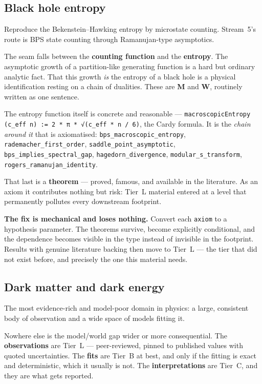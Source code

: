 \documentclass[11pt,a4paper]{article}
\begin{document}
\subsection{Black hole entropy}

Reproduce the Bekenstein–Hawking entropy by microstate counting. Stream~5's route is BPS state
counting through Ramanujan-type asymptotics.

The seam falls between the \textbf{counting function} and the \textbf{entropy}. The asymptotic
growth of a partition-like generating function is a hard but ordinary analytic fact. That this
growth \emph{is} the entropy of a black hole is a physical identification resting on a chain of
dualities. These are \textbf{M} and \textbf{W}, routinely written as one sentence.

The entropy function itself is concrete and reasonable —
\texttt{macroscopicEntropy (c_eff n) := 2 * π * √(c_eff * n / 6)}, the Cardy formula. It is
the \emph{chain around it} that is axiomatised: \texttt{bps_macroscopic_entropy},
\texttt{rademacher_first_order}, \texttt{saddle_point_asymptotic},
\texttt{bps_implies_spectral_gap}, \texttt{hagedorn_divergence}, \texttt{modular_s_transform},
\texttt{rogers_ramanujan_identity}.

That last is a \textbf{theorem} — proved, famous, and available in the literature. As an axiom it
contributes nothing but risk: Tier~L material entered at a level that permanently pollutes every
downstream footprint.

\textbf{The fix is mechanical and loses nothing.} Convert each \texttt{axiom} to a hypothesis
parameter. The theorems survive, become explicitly conditional, and the dependence becomes
visible in the type instead of invisible in the footprint. Results with genuine literature
backing then move to Tier~\textsf{L} — the tier that did not exist before, and precisely the one
this material needs.

\subsection{Dark matter and dark energy}

The most evidence-rich and model-poor domain in physics: a large, consistent body of observation
and a wide space of models fitting it.

Nowhere else is the model/world gap wider or more consequential. The \textbf{observations} are
Tier~L — peer-reviewed, pinned to published values with quoted uncertainties. The \textbf{fits}
are Tier~B at best, and only if the fitting is exact and deterministic, which it usually is not.
The \textbf{interpretations} are Tier~C, and they are what gets reported.
\end{document}
